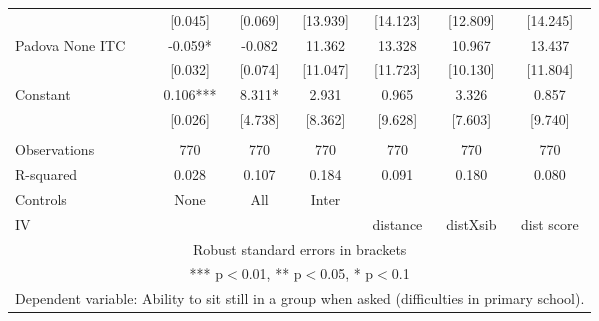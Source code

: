 \begin{tabular}{lcccccc}
 & [0.045] & [0.069] & [13.939] & [14.123] & [12.809] & [14.245] \\
Padova None ITC & -0.059* & -0.082 & 11.362 & 13.328 & 10.967 & 13.437 \\
 & [0.032] & [0.074] & [11.047] & [11.723] & [10.130] & [11.804] \\
Constant & 0.106*** & 8.311* & 2.931 & 0.965 & 3.326 & 0.857 \\
 & [0.026] & [4.738] & [8.362] & [9.628] & [7.603] & [9.740] \\
 &  &  &  &  &  &  \\
Observations & 770 & 770 & 770 & 770 & 770 & 770 \\
R-squared & 0.028 & 0.107 & 0.184 & 0.091 & 0.180 & 0.080 \\
Controls & None & All & Inter &  &  &  \\
 IV &  &  &  & distance & distXsib & dist score \\ \hline
\multicolumn{7}{c}{ Robust standard errors in brackets} \\
\multicolumn{7}{c}{ *** p$<$0.01, ** p$<$0.05, * p$<$0.1} \\
\multicolumn{7}{c}{ Dependent variable: Ability to sit still in a group when asked (difficulties in primary school).} \\
\end{tabular}
